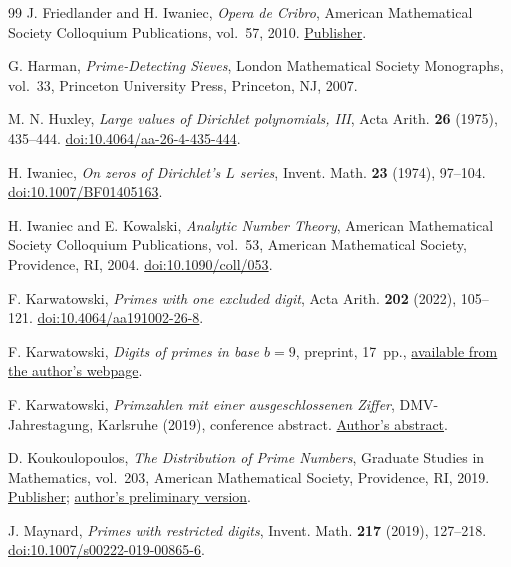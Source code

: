 \documentclass[11pt,a4paper]{article}
\theoremstyle{paperplain}
\numberwithin{equation}{section}
\begin{document}
\begin{thebibliography}{99}
J. Friedlander and H. Iwaniec, \emph{Opera de Cribro}, American
Mathematical Society Colloquium Publications, vol.~57, 2010.
\href{https://doi.org/10.1090/coll/057}{Publisher}.

G. Harman,
\textit{Prime-Detecting Sieves},
London Mathematical Society Monographs, vol.~33,
Princeton University Press, Princeton, NJ, 2007.

M. N. Huxley, \emph{Large values of Dirichlet polynomials, III},
Acta Arith. \textbf{26} (1975), 435--444.
\href{https://doi.org/10.4064/aa-26-4-435-444}{doi:10.4064/aa-26-4-435-444}.

H. Iwaniec, \emph{On zeros of Dirichlet's \(L\) series},
Invent. Math. \textbf{23} (1974), 97--104.
\href{https://doi.org/10.1007/BF01405163}{doi:10.1007/BF01405163}.

H. Iwaniec and E. Kowalski,
\textit{Analytic Number Theory},
American Mathematical Society Colloquium Publications, vol.~53,
American Mathematical Society, Providence, RI, 2004.
\href{https://doi.org/10.1090/coll/053}{doi:10.1090/coll/053}.

F. Karwatowski,
\textit{Primes with one excluded digit},
Acta Arith. \textbf{202} (2022), 105--121.
\href{https://doi.org/10.4064/aa191002-26-8}{doi:10.4064/aa191002-26-8}.

F. Karwatowski,
\textit{Digits of primes in base $b=9$},
preprint, 17~pp.,
\href{https://www.math.hhu.de/fileadmin/redaktion/Fakultaeten/Mathematisch-Naturwissenschaftliche_Fakultaet/Mathematik/20_Institut-Lehrstuehle/5_Algebra_und_Zahlentheorie/Karwatowski/Digits_of_primes_in_base_b_9.pdf}{available from the author's webpage}.

F. Karwatowski, \emph{Primzahlen mit einer ausgeschlossenen Ziffer},
DMV-Jahrestagung, Karlsruhe (2019), conference abstract.
\href{https://dmv2019.math.kit.edu/wp-content/uploads/2019/07/Karwatowski_PrimAusgeschZiff.pdf}{Author's abstract}.

D. Koukoulopoulos,
\textit{The Distribution of Prime Numbers},
Graduate Studies in Mathematics, vol.~203,
American Mathematical Society, Providence, RI, 2019.
\href{https://doi.org/10.1090/gsm/203}{Publisher}; \href{https://dms.umontreal.ca/~koukoulo/documents/publications/primes.pdf}{author's preliminary version}.

J. Maynard,
\textit{Primes with restricted digits},
Invent. Math. \textbf{217} (2019), 127--218.
\href{https://doi.org/10.1007/s00222-019-00865-6}{doi:10.1007/s00222-019-00865-6}.


\end{thebibliography}
\end{document}
